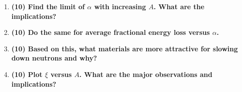 \documentclass[11pt,a4paper]{article}
\begin{document}
\begin{enumerate}[leftmargin=*,topsep=0pt,font=\bfseries]
        
        
        
        
        
        \newpage
    \item\textbf{(10) Find the limit of $\alpha$ with increasing $A$. What are the implications?}
        \vspace{0.25in}\\

        
        
        
        
        
        
        
        
        
        
        
        
        
        \newpage
    \item\textbf{(10) Do the same for average fractional energy loss versus $\alpha$.}
        \vspace{0.25in}\\














        \newpage
    \item\textbf{(10) Based on this, what materials are more attractive for slowing down neutrons and why?}
        \vspace{0.25in}\\

        
        
        
        
        
        
        
        
        
        
        
        
        \newpage
    \item\textbf{(10) Plot $\xi$ versus $A$. What are the major observations and implications?}
        \vspace{0.25in}\\
        
        
        
        
        
        
        
        
        
        
        
        
        

\end{enumerate}
\end{document}

